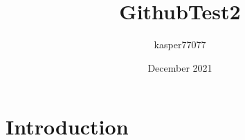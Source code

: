 \documentclass{article}
\title{GithubTest2}
\author{kasper77077 }
\date{December 2021}
\begin{document}
\maketitle

\section{Introduction}
\end{document}
